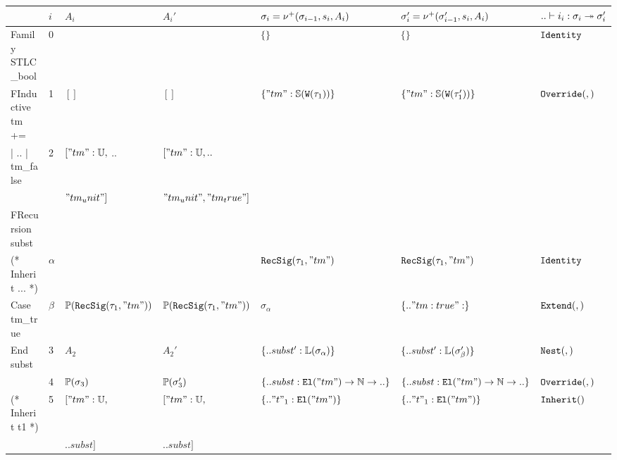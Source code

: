 \begin{table}[]
  \begin{tabular}{|l|l|l|l|l|l|l|}
  \hline
   &
    $i$ &
    $A_i$ &
    $A_i'$ &
    $\sigma_i = \nu^+({\sigma_{i-1}},{s_i},{A_i})$ &
    $\sigma_i' = \nu^+({\sigma_{i-1}'},{s_i},{A_i})$ &
    $ {..} \vdash {i_i} : {\sigma_i} \twoheadrightarrow {\sigma_i'}$ \\ \hline
  Family STLC\_bool &
    0 &
     &
     &
    $\{\}$ &
    $\{\}$ &
    $\texttt{Identity}$ \\ \hline
  FInductive tm += &
    1 &
    $[]$ &
    $[]$ &
    $\{"tm" : \mathbb{S}({\texttt{W}({\tau_1})})\}$ &
    $\{"tm" : \mathbb{S}({\texttt{W}({\tau_1'})})\}$ &
    $\texttt{Override}({},{})$ \\ \hline
  | .. | tm\_false &
    2 &
    $["tm" : \mathbb{U},$ .. &
    $["tm" : \mathbb{U}, ..$ &
     &
     &
     \\ \hline
   &
     &
    $"tm_unit"]$ &
    $"tm_unit", "tm_true" ]$ &
     &
     &
     \\ \hline
  FRecursion subst &
     &
     &
     &
     &
     &
     \\ \hline
  (* Inherit ... *) &
    $\alpha$ &
     &
     &
    $\texttt{RecSig}({\tau_1},{"tm"})$ &
    $\texttt{RecSig}({\tau_1},{"tm"})$ &
    $\texttt{Identity}$ \\ \hline
  Case tm\_true &
    $\beta$ &
    $\mathbb{P}({\texttt{RecSig}({\tau_1},{"tm"})})$ &
    $\mathbb{P}({\texttt{RecSig}({\tau_1},{"tm"})})$ &
    $\sigma_{\alpha}$ &
    $\{.. "tm:true": \}$ &
    $\texttt{Extend}({},{})$ \\ \hline
  End subst &
    3 &
    $A_2$ &
    $A_2'$ &
    $\{.. subst' : \mathbb{L}({\sigma_\alpha})\}$ &
    $\{.. subst' : \mathbb{L}({\sigma_\beta'})\}$ &
    $\texttt{Nest}({},{})$ \\ \hline
   &
    4 &
    $\mathbb{P}({\sigma_3})$ &
    $\mathbb{P}({\sigma_3'})$ &
    $\{.. subst : \texttt{El}({"tm"}) \to \mathbb{N} \to ..\}$ &
    $\{.. subst : \texttt{El}({"tm"}) \to \mathbb{N} \to ..\}$ &
    $\texttt{Override}({},{})$ \\ \hline
  (* Inherit t1 *) &
    5 &
    $["tm":\mathbb{U}, $ &
    $["tm":\mathbb{U}, $ &
    $\{.. "t"_1 : \texttt{El}({"tm"})\}$ &
    $\{.. "t"_1 : \texttt{El}({"tm"})\}$ &
    $\texttt{Inherit}({})$ \\ \hline
   &
     &
    $.. subst]$ &
    $.. subst]$ &
     &
     &
     \\ \hline
  \end{tabular}
  \end{table}